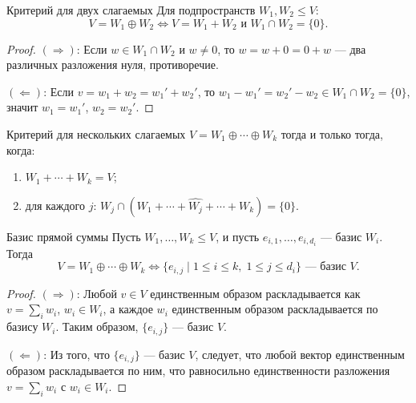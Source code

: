 \begin{Theorem}{Критерий для двух слагаемых}{}
    Для подпространств $W_1, W_2 \leq V$:
    \[
        V = W_1 \oplus W_2 \iff V = W_1 + W_2 \text{ и } W_1 \cap W_2 = \{0\}.
    \]
\end{Theorem}

\begin{proof}
$(\Rightarrow)$: Если $w \in W_1 \cap W_2$ и $w \neq 0$, то $w = w + 0 = 0 + w$ — два различных разложения нуля, противоречие.

$(\Leftarrow)$: Если $v = w_1 + w_2 = w_1' + w_2'$, то $w_1 - w_1' = w_2' - w_2 \in W_1 \cap W_2 = \{0\}$, значит $w_1 = w_1'$, $w_2 = w_2'$.
\end{proof}

\begin{Theorem}{Критерий для нескольких слагаемых}{}
    $V = W_1 \oplus \cdots \oplus W_k$ тогда и только тогда, когда:
    \begin{enumerate}
        \item $W_1 + \cdots + W_k = V$;
        \item для каждого $j$: $W_j \cap (W_1 + \cdots + \widehat{W_j} + \cdots + W_k) = \{0\}$.
    \end{enumerate}
\end{Theorem}

\begin{Theorem}{Базис прямой суммы}{}
    Пусть $W_1, \ldots, W_k \leq V$, и пусть $e_{i,1}, \ldots, e_{i,d_i}$ — базис $W_i$. Тогда
    \[
        V = W_1 \oplus \cdots \oplus W_k \iff \{e_{i,j} \mid 1 \leq i \leq k,\; 1 \leq j \leq d_i\} \text{ — базис } V.
    \]
\end{Theorem}

\begin{proof}
$(\Rightarrow)$: Любой $v \in V$ единственным образом раскладывается как $v = \sum_i w_i$, $w_i \in W_i$, а каждое $w_i$ единственным образом раскладывается по базису $W_i$. Таким образом, $\{e_{i,j}\}$ — базис $V$.

$(\Leftarrow)$: Из того, что $\{e_{i,j}\}$ — базис $V$, следует, что любой вектор единственным образом раскладывается по ним, что равносильно единственности разложения $v = \sum_i w_i$ с $w_i \in W_i$.
\end{proof}
